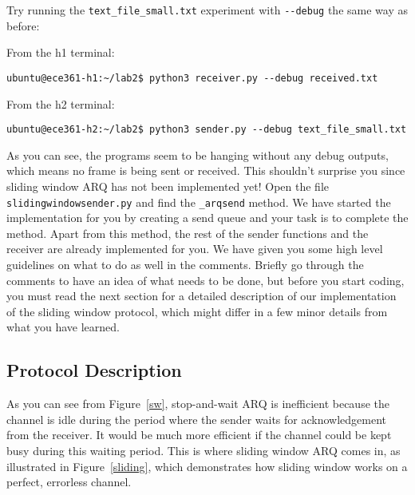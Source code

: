 \documentclass[11pt]{article}
\begin{document}

Try running the \texttt{text\_file\_small.txt} experiment with \texttt{-{}-debug} the same way as before:

\noindent From the h1 terminal:
\begin{lstlisting}[style=ece361-shell-base]
ubuntu@ece361-h1:~/lab2$ python3 receiver.py --debug received.txt
\end{lstlisting}
From the h2 terminal:
\begin{lstlisting}[style=ece361-shell-base]
ubuntu@ece361-h2:~/lab2$ python3 sender.py --debug text_file_small.txt
\end{lstlisting}

As you can see, the programs seem to be hanging without any debug outputs, which means no frame is being sent or received.
This shouldn't surprise you since sliding window ARQ has not been implemented yet!
Open the file \texttt{slidingwindowsender.py} and find the \texttt{\_arqsend} method.
We have started the implementation for you by creating a send queue and your task is to complete the method.
Apart from this method, the rest of the sender functions and the receiver are already implemented for you.
We have given you some high level guidelines on what to do as well in the comments.
Briefly go through the comments to have an idea of what needs to be done, but before you start coding, you must read the next section for a detailed description of our implementation of the sliding window protocol, which might differ in a few minor details from what you have learned.

\subsection{Protocol Description}
As you can see from Figure~\ref{sw}, stop-and-wait ARQ is inefficient because the channel is idle during the period where the sender waits for acknowledgement from the receiver.
It would be much more efficient if the channel could be kept busy during this waiting period.
This is where sliding window ARQ comes in, as illustrated in Figure~\ref{sliding},
which demonstrates how sliding window works on a perfect, errorless channel.
\end{document}
